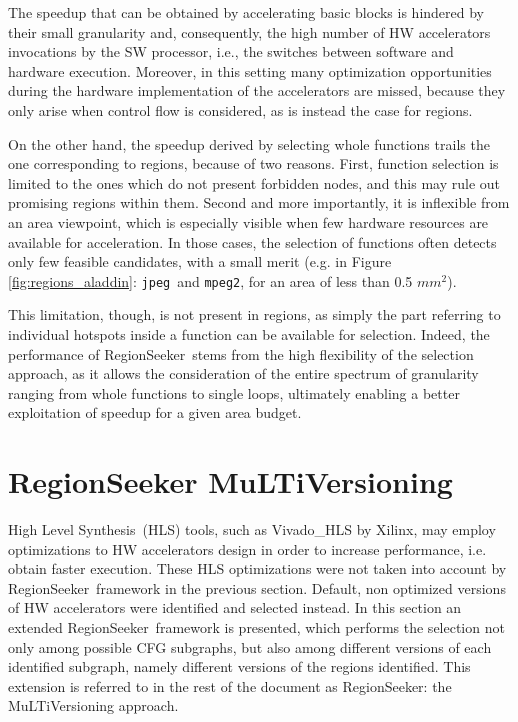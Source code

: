 \documentclass[]{usiinfthesis}
\newcommand{\rseeker}{{RegionSeeker}}
\newcommand{\HLS}{{High Level Synthesis}}
\newcommand{\jpeg}{\texttt{jpeg}}
\newcommand{\mpeg}{\texttt{mpeg2}}
\begin{document}
The speedup that can be obtained by accelerating basic blocks is
hindered by their small granularity and, consequently, the high number
of HW accelerators invocations by the SW processor, i.e., the switches 
between software and hardware execution. Moreover, in this
setting many optimization opportunities
during the hardware implementation of the accelerators are missed,
because they only arise when control flow is considered, as is instead the case
for regions.\par

On the other hand, the speedup derived by selecting whole functions
trails the one corresponding to regions, because of two
reasons. First, function selection is limited to the ones which do not
present forbidden nodes, and this may rule out promising regions
within them. Second and more importantly, it is inflexible from
an area viewpoint, which is especially visible when few hardware
resources are available for acceleration. In those cases, the
selection of functions often detects only few feasible candidates,
with a small merit (e.g. in Figure \ref{fig:regions_aladdin}: \jpeg\ and 
\mpeg, for an area of less than 0.5 $mm^2$).\par

This limitation, though, is not present in regions, as simply the part
referring to individual hotspots inside a function can be available
for selection. Indeed, the performance of \rseeker\ stems from the high
flexibility of the selection approach, as it allows the consideration of
the entire spectrum of granularity ranging from whole functions to
single loops, ultimately enabling a better exploitation of speedup for
a given area budget.


\newpage
\section{RegionSeeker MuLTiVersioning}

\HLS\ (HLS) tools, such as Vivado\_HLS by Xilinx, may employ %
optimizations to HW accelerators
design in order to increase performance, i.e. obtain faster execution. These 
HLS optimizations were not taken into account by \rseeker\ framework in the
previous section. Default, non optimized versions of HW accelerators were identified
and selected instead. In this
section an extended \rseeker\ framework is presented, which performs the selection not 
only among possible CFG subgraphs, but also among different versions of each identified 
subgraph, namely different versions of the regions identified. 
This extension is referred to in the rest of the document as RegionSeeker: the 
MuLTiVersioning approach.
\end{document}
